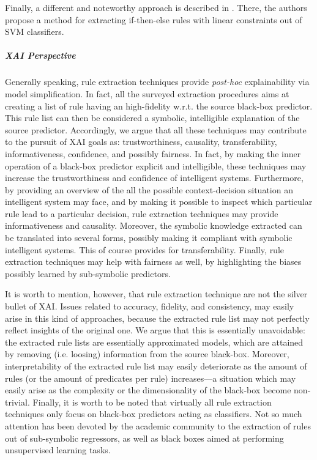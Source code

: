 \documentclass[12pt,a4paper,openright,twoside]{book}
\begin{document}
Finally, a different and noteworthy approach is described in \cite{NunezAC08}.
%
There, the authors propose a method for extracting if-then-else rules with linear constraints out of SVM classifiers.

\subparagraph{XAI Perspective}

Generally speaking, rule extraction techniques provide \emph{post-hoc} explainability via model simplification.
%
In fact, all the surveyed extraction procedures aims at creating a list of rule having an high-fidelity w.r.t. the source black-box predictor.
%
This rule list can then be considered a symbolic, intelligible explanation of the source predictor.
%
Accordingly, we argue that all these techniques may contribute to the pursuit of XAI goals as: trustworthiness, causality, transferability, informativeness, confidence, and possibly fairness.
%
In fact, by making the inner operation of a black-box predictor explicit and intelligible, these techniques may increase the trustworthiness and confidence of intelligent systems.
%
Furthermore, by providing an overview of the all the possible context-decision situation an intelligent system may face, and by making it possible to inspect which particular rule lead to a particular decision, rule extraction techniques may provide informativeness and causality.
%
Moreover, the symbolic knowledge extracted can be translated into several forms, possibly making it compliant with symbolic intelligent systems.
%
This of course provides for transferability.
%
Finally, rule extraction techniques may help with fairness as well, by highlighting the biases possibly learned by sub-symbolic predictors.

It is worth to mention, however, that rule extraction technique are not the silver bullet of XAI.
%
Issues related to accuracy, fidelity, and consistency, may easily arise in this kind of approaches, because the extracted rule list may not perfectly reflect insights of the original one.
%
We argue that this is essentially unavoidable: the extracted rule lists are essentially approximated models, which are attained by removing (i.e. loosing) information from the source black-box.
%
Moreover, interpretability of the extracted rule list may easily deteriorate as the amount of rules (or the amount of predicates per rule) increases---a situation which may easily arise as the complexity or the dimensionality of the black-box become non-trivial.
%
Finally, it is worth to be noted that virtually all rule extraction techniques only focus on black-box predictors acting as classifiers.
%
Not so much attention has been devoted by the academic community to the extraction of rules out of sub-symbolic regressors, as well as black boxes aimed at performing unsupervised learning tasks.
\end{document}
